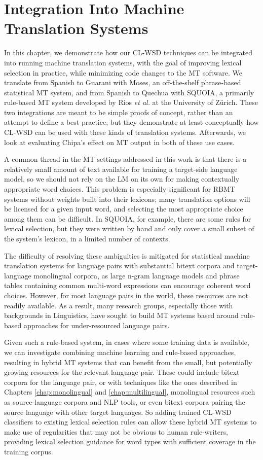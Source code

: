 \chapter{Integration Into Machine Translation Systems}
\label{chap:integration}
In this chapter, we demonstrate how our CL-WSD techniques can be integrated
into running machine translation systems, with the goal of improving lexical
selection in practice, while minimizing code changes to the MT software. We
translate from Spanish to Guarani with Moses\cite{koehn-EtAl:2007:PosterDemo},
an off-the-shelf phrase-based statistical MT system, and from Spanish to
Quechua with SQUOIA\cite{rios2015basic}, a primarily rule-based MT system
developed by Rios \emph{et al.} at the University of Zürich. These two
integrations are meant to be simple proofs of concept, rather than an attempt
to define a best practice, but they demonstrate at least conceptually how
CL-WSD can be used with these kinds of translation systems. Afterwards, we look
at evaluating Chipa's effect on MT output in both of these use cases.

A common thread in the MT settings addressed in this work is that there is a
relatively small amount of text available for training a target-side language
model, so we should not rely on the LM on its own for making contextually
appropriate word choices. This problem is especially significant for RBMT
systems without weights built into their lexicons; many translation options
will be licensed for a given input word, and selecting the most appropriate
choice among them can be difficult. In SQUOIA, for example, there are some
rules for lexical selection, but they were written by hand and only cover a
small subset of the system's lexicon, in a limited number of contexts.

The difficulty of resolving these ambiguities is mitigated for statistical
machine translation systems for language pairs with substantial bitext corpora
and target-language monolingual corpora, as large n-gram language models and
phrase tables containing common multi-word expressions can encourage coherent
word choices. However, for most language pairs in the world, these resources
are not readily available. As a result, many research groups, especially those
with backgrounds in Linguistics, have sought to build MT systems based around
rule-based approaches for under-resourced language pairs.

Given such a rule-based system, in cases where some training data is available,
we can investigate combining machine learning and rule-based approaches,
resulting in hybrid MT systems that can benefit from the small, but potentially
growing resources for the relevant language pair. These could include bitext
corpora for the language pair, or with techniques like the ones described in
Chapters \ref{chap:monolingual} and \ref{chap:multilingual}, monolingual
resources such as source-language corpora and NLP tools, or even bitext corpora
pairing the source language with other target languages. So adding trained
CL-WSD classifiers to existing lexical selection rules can allow these hybrid
MT systems to make use of regularities that may not be obvious to human
rule-writers, providing lexical selection guidance for word types with
sufficient coverage in the training corpus.

